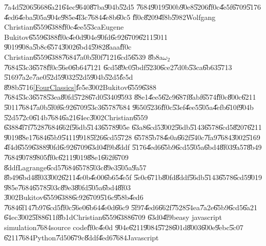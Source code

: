 \documentclass[12pt,a4paper]{article}
\begin{document}
\bigskip

\U{7a4d}\U{5206}\U{5668}\U{6a21}\U{64ec}\U{9640}\U{87ba}\U{904b}\U{52d5}%
\U{7684}\U{9019}\U{500b}\U{90e8}\U{5206}\U{ff0c}\U{4e5f}\U{6709}\U{5176}%
\U{4ed6}\U{4eba}\U{505a}\U{904e}\U{985e}\U{4f3c}\U{7684}\U{4e8b}\U{60c5}%
\U{ff0c}\U{8209}\U{4f8b}\U{5982}Wolfgang Christian\U{6559}\U{6388}\cite%
{wolfgangSimMeth}\U{ff0c}\U{4ee5}\U{53ca}Eugene Bukitov\U{6559}\U{6388}\cite%
{eugene}\U{ff0c}\U{4e0d}\U{904e}\U{90fd}\U{6c92}\U{6709}\U{6211}\U{5011}%
\U{9019}\U{908a}\U{5b8c}\U{6574}\U{3002}\U{6bd4}\U{5982}\U{8aaa}\U{ff0c}%
Christian\U{6559}\U{6388}\U{7684}\U{7a0b}\U{5f0f}\U{7121}\U{6cd5}\U{6539}%
\U{8b8a}$\omega _{2}$\U{7684}\U{53c3}\U{6578}\U{ff0c}\U{56e0}\U{6b64}\U{7121}%
\U{6cd5}\U{89c0}\U{5bdf}\U{5230}\U{6ce2}\U{7d0b}\U{53ca}\U{6b63}\U{5713}%
\U{5169}\U{7a2e}\U{7ae0}\U{52d5}\U{9032}\U{52d5}\U{904b}\U{52d5}\U{fe5d}%
\U{898b}\U{5716}\ref{FourClassics}\U{fe5e}\U{3002}Bukitov\U{6559}\U{6388}%
\U{7684}\U{53c3}\U{6578}\U{53ea}\U{80fd}\U{5728}\U{67d0}\U{5340}\U{9593}%
\U{88e1}\U{4ee5}\U{62c9}\U{687f}\U{8abf}\U{6574}\U{ff0c}\U{800c}\U{6211}%
\U{5011}\U{7684}\U{7a0b}\U{5f0f}\U{6c92}\U{6709}\U{53c3}\U{6578}\U{7684}%
\U{9650}\U{5236}\U{ff0c}\U{53ef}\U{4ee5}\U{505a}\U{4efb}\U{610f}\U{904b}%
\U{52d5}\U{72c0}\U{614b}\U{7684}\U{6a21}\U{64ec}\U{3002}Christian\U{6559}%
\U{6388}\U{4f7f}\U{7528}\U{7684}\U{662f}\U{56db}\U{5143}\U{6578}\U{905e}%
\U{63a8}\U{6cd5}\U{3002}\U{56db}\U{5143}\U{6578}\U{6cd5}\U{8207}\U{6211}%
\U{9019}\U{88e1}\U{7684}\U{65b9}\U{5411}\U{9918}\U{5f26}\U{6cd5}\U{5728}%
\U{6578}\U{5b78}\U{4e0a}\U{662f}\U{540c}\U{7fa9}\U{7684}\U{3002}\U{5169}%
\U{4f4d}\U{6559}\U{6388}\U{90fd}\U{6c92}\U{6709}\U{63d0}\U{4f9b}\U{8ddf}%
\U{5176}\U{4ed6}\U{65b9}\U{6cd5}\U{505a}\U{6bd4}\U{8f03}\U{9a57}\U{8b49}%
\U{7684}\U{9078}\U{9805}\U{ff0c}\U{6211}\U{9019}\U{88e1}\U{662f}\U{6709}%
\U{8ddf}Lagrange\U{6cd5}\U{7684}\U{6578}\U{503c}\U{89e3}\U{505a}\U{9a57}%
\U{8b49}\U{6bd4}\U{8f03}\U{3002}\U{6211}\U{4e0b}\U{4e00}\U{6b65}\U{4e5f}%
\U{5e0c}\U{671b}\U{80fd}\U{8ddf}\U{56db}\U{5143}\U{6578}\U{6cd5}\U{9019}%
\U{985e}\U{7684}\U{6578}\U{503c}\U{89e3}\U{80fd}\U{505a}\U{6bd4}\U{8f03}%
\U{3002}Bukitov\U{6559}\U{6388}\U{6c92}\U{6709}\U{516c}\U{958b}\U{4ed6}%
\U{7684}\U{6f14}\U{7b97}\U{6cd5}\U{ff0c}\U{56e0}\U{6b64}\U{4e0d}\U{66c9}%
\U{5f97}\U{4ed6}\U{662f}\U{7528}\U{54ea}\U{7a2e}\U{65b9}\U{6cd5}\U{6a21}%
\U{64ec}\U{3002}\U{5f88}\U{611f}\U{8b1d}Christian\U{6559}\U{6388}\U{6709}%
\U{63d0}\U{4f9b}easy javascript simulation\U{7684}source code\U{ff0c}\U{4e0d}%
\U{904e}\U{6211}\U{9084}\U{5728}\U{601d}\U{8003}\U{600e}\U{9ebc}\U{5c07}%
\U{6211}\U{7684}Python\U{7d50}\U{679c}\U{8ddf}\U{4ed6}\U{7684}Javascript%
\end{document}
